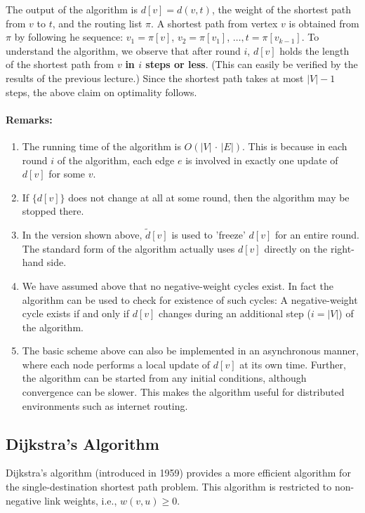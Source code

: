 The output of the algorithm is $d[v] = d(v,t)$, the weight of the shortest path from $v$ to $t$, and the routing list $\pi $. A shortest path from vertex $v$ is obtained from $\pi $ by following he sequence: ${v_1} = \pi [v]$, ${v_2} = \pi [{v_1}]$, $ \ldots ,$$t = \pi [{v_{k - 1}}]$.
To understand the algorithm, we observe that after round $i$, $d[v]$ holds the length of the shortest path from $v$ \textbf{in $i$ steps or less}. (This can easily be verified by the results of the previous lecture.) Since the shortest path takes at most $|V| - 1$ steps, the above claim on optimality follows.

\paragraph{Remarks:}
\begin{enumerate}
  \item The running time of the algorithm is $O(|V|\, \cdot \,|E|)$. This is because in each round $i$ of the algorithm, each edge $e$ is involved in exactly one update of $d[v]$ for some $v$.
  \item If $\{ d[v]\}$ does not change at all at some round, then the algorithm may be stopped there.
  \item In the version shown above, $\tilde d[v]$ is used to 'freeze' $d[v]$ for an entire round. The standard form of the algorithm actually uses $d[v]$ directly on the right-hand side.
  \item We have assumed above that no negative-weight cycles exist. In fact the algorithm can be used to check for existence of such cycles: A negative-weight cycle exists if and only if  $d[v]$ changes during an additional step ($i = |V|$) of the algorithm.
  \item The basic scheme above can also be implemented in an asynchronous manner, where each node performs a local update of $d[v]$ at its own time. Further, the algorithm can be started from any initial conditions, although convergence can be slower. This makes the algorithm useful for distributed environments such as internet routing.
\end{enumerate}

\subsection{Dijkstra's Algorithm}
Dijkstra's algorithm (introduced in 1959) provides a more efficient algorithm for the single-destination shortest path problem. This algorithm is restricted to non-negative link weights, i.e., $w(v,u) \ge 0$.

